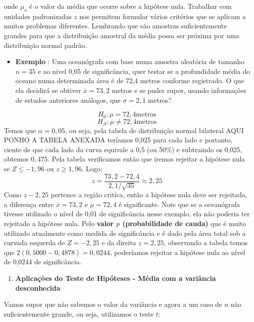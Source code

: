 \documentclass[
  openany]{book}
\providecommand{\tightlist}{%
  \setlength{\itemsep}{0pt}\setlength{\parskip}{0pt}}
\begin{document}
onde \(\mu_o\) é o valor da média que ocorre sobre a hipótese nula. Trabalhar com unidades padronizadas \(z\) nos permitem formular vários critérios que se aplicam a muitos problemas diferentes. Lembrando que são amostras suficientemente grandes para que a distribuição amostral da média possa ser próxima por uma distribuição normal padrão.

\begin{itemize}
\tightlist
\item
  \textbf{Exemplo} \citep{freund2009estatistica}: Uma oceanógrafa com base numa amostra aleatória de tamanho \(n=35\) e ao nível 0,05 de significância, quer testar se a profundidade média do oceano numa determinada área é de 72,4 metros conforme registrado. O que ela decidirá se obtiver \(\overline{x}=73,2\) metros e se puder supor, usando informações de estudos anteriores análogos, que \(\sigma=2,1\) metros?
\end{itemize}

\[H_0: \mu=72,4 \mbox{metros}\]
\[H_A: \mu \neq 72,4 \mbox{metros}\]
Temos que \(\alpha=0,05\), ou seja, pela tabela de distribuição normal bilateral AQUI PONHO A TABELA ANEXADA teríamos 0,025 para cada lado e portanto, ciente de que cada lado da curva equivale a 0,5 (ou 50\%) e subtraindo os 0,025, obtemos \(0,475\). Pela tabela verificamos então que iremos rejeitar a hipótese nula se \(Z \leq -1,96\) ou \(z \geq 1,96\). Logo:
\[z=\frac{73,2-72,4}{2,1/\sqrt{35}}\approx 2,25\]
Como \(z-2,25\) pertence a região critíca, então a hipótese nula deve ser rejeitada, a diferença entre \(\overline{x}=73,2\) e \(\mu=72,4\) é significante. Note que se a oceanógrafa tivesse utilizado o nível de 0,01 de significância nesse exemplo, ela não poderia ter rejeitado a hipótese nula. Pelo \textbf{valor \(p\) (probabilidade de cauda)} que é muito utilizado atualmente como medida de significância e é dado pela área total sob a curvada esquerda de \(Z=-2,25\) e da direita \(z=2,25\), observando a tabela temos que \(2(0,5000-0,4878)=0,0244\), poderíamos rejeitar a hipótese nula ao nível de 0,0244 de significância.

\begin{enumerate}
\def\labelenumi{\arabic{enumi}.}
\setcounter{enumi}{14}
\tightlist
\item
  \textbf{Aplicações do Teste de Hipóteses - Média com a variância desconhecida}
\end{enumerate}

Vamos supor que não sabemos o valor da variância e agora a um caso de \(n\) não suficientemente grande, ou seja, utilizamos o teste \(t\):
\end{document}

